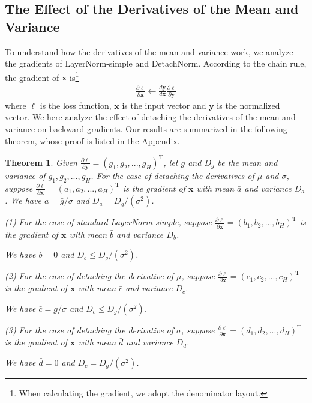 \documentclass{article}
\newtheorem{thm}{Theorem}[]
\newcommand*{\vect}[1]{\textbf{#1}}
\begin{document}
\subsection{The Effect of the Derivatives of the Mean and Variance}
To understand how the derivatives of the mean and variance work, we analyze the gradients of LayerNorm-simple and DetachNorm. According to the chain rule, the gradient of $\vect{x}$ is\footnote{When calculating the gradient, we adopt the denominator layout.}\begin{equation}\begin{aligned}
\frac{\partial\ell}{\partial\vect{x}}\gets \frac{d\vect{y}}{d\vect{x}}\frac{\partial\ell}{\partial\vect{y}}
\end{aligned}\end{equation}
where $\ell$ is the loss function, $\vect{x}$ is the input vector and $\vect{y}$ is the normalized vector. We here analyze the effect of detaching the derivatives of the mean and variance on backward gradients. Our results are summarized in the following theorem, whose proof is listed in 
the Appendix.

\begin{thm}
\label{thm1}
Given $\frac{\partial\ell}{\partial\vect{y}}=(g_1, g_2,..., g_H)^\text{T}$, let $\bar g$ and $D_g$ be the mean and variance of $g_1, g_2,..., g_H$.  For the case of detaching the derivatives of $\mu$ and $\sigma$,  suppose $\frac{\partial\ell}{\partial\vect{x}}=(a_1, a_2, ..., a_H)^\text{T}$ is the gradient of $\vect{x}$ with mean  $\bar a$ and variance $D_a$. 
We have  $\bar a=\bar g/\sigma$ and $D_a=D_g/(\sigma^2)$.


\quad (1) For the case of standard LayerNorm-simple, suppose $\frac{\partial\ell}{\partial\vect{x}}=(b_1, b_2, ..., b_H)^\text{T}$ is the gradient of $\vect{x}$ with mean $\bar b$ and variance $D_b$. 
\begin{center}
We have $\bar b=0$ and $D_b\le D_g/(\sigma^2)$.  
\end{center}

 \quad(2) For the case of detaching the derivative of $\mu$, suppose $\frac{\partial\ell}{\partial\vect{x}}=(c_1, c_2, ..., c_H)^\text{T}$ is the gradient of $\vect{x}$ with mean $\bar c$ and variance $D_c$.
\begin{center}
We have $\bar c=\bar g/\sigma$ and $D_c\le D_g/(\sigma^2)$.
\end{center}
 \quad(3) For the case of detaching the derivative of $\sigma$, suppose $\frac{\partial\ell}{\partial\vect{x}}=(d_1, d_2, ..., d_H)^\text{T}$ is the gradient of $\vect{x}$ with mean $\bar d$ and variance $D_d$. 
\begin{center}
We have $\bar d=0$ and $D_c=D_g/(\sigma^2)$.
\end{center}

\end{thm}
\end{document}
